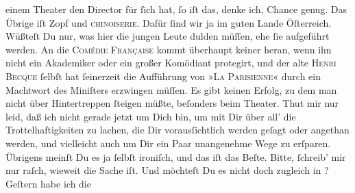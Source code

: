 \begin{ledgroupsized}[t]{13cm}
               einem Theater den Director für ſich hat, ſo iſt das, denke ich, Chance genug. Das {\pb}Übrige iſt Zopf und \textsc{chinoiserie}. Dafür ſind wir ja im guten Lande Öſterreich. Wüßteſt Du nur, was hier die jungen Leute dulden müſſen, ehe ſie
               aufgeführt werden. An die \textsc{Comédie
                     Française} kommt überhaupt keiner heran, wenn ihn nicht ein Akademiker oder ein großer
               Komödiant protegirt, und  der alte \textsc{Henri Becque} ſelbſt hat ſeinerzeit die Aufführung von »\textsc{La Parisienne}« durch ein
               Machtwort des Miniſters
               erzwingen müſſen. Es gibt keinen Erfolg, zu dem man nicht über Hintertreppen ſteigen
               müßte, beſonders beim Theater. Thut mir nur leid, daß ich nicht gerade jetzt um Dich
               bin, um {\pb}mit Dir über all’ die Trottelhaftigkeiten
               zu lachen, die Dir vorausſichtlich werden geſagt oder angethan werden, und vielleicht
               auch um Dir ein Paar unangenehme Wege zu erſparen. Übrigens meinſt Du es ja ſelbſt
               ironiſch, und das iſt das Beſte. Bitte, ſchreib’ mir nur raſch, wieweit die Sache
               iſt. Und möchteſt Du es nicht doch zugleich in \label{K_L02620-3v}\label{K_L02620-3h}?\pend
           \pstart
           Geſtern habe ich die \label{K_L02620-2v}
\end{ledgroupsized}
